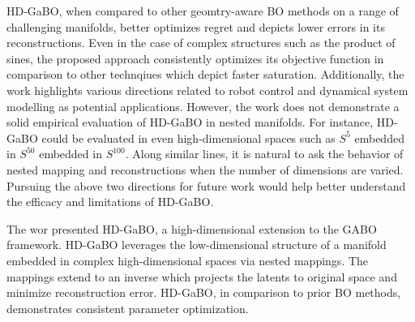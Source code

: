 \documentclass[12pt,letterpaper]{article}
\begin{document}
HD-GaBO, when compared to other geomtry-aware BO methods on a range of challenging manifolds, better optimizes regret and depicts lower errors in its reconstructions. Even in the case of complex structures such as the product of sines, the proposed approach consistently optimizes its objective function in comparison to other technqiues which depict faster saturation. Additionally, the work highlights various directions related to robot control and dynamical system modelling as potential applications. However, the work does not demonstrate a solid empirical evaluation of HD-GaBO in nested manifolds. For instance, HD-GaBO could be evaluated in even high-dimensional spaces such as $S^{5}$ embedded in $S^{50}$ embedded in $S^{100}$. Along similar lines, it is natural to ask the behavior of nested mapping and reconstructions when the number of dimensions are varied. Pursuing the above two directions for future work would help better understand the efficacy and limitations of HD-GaBO.

The wor presented HD-GaBO, a high-dimensional extension to the GABO framework. HD-GaBO leverages the low-dimensional structure of a manifold embedded in complex high-dimensional spaces via nested mappings. The mappings extend to an inverse which projects the latents to original space and minimize reconstruction error. HD-GaBO, in comparison to prior BO methods, demonstrates consistent parameter optimization.
\end{document}
